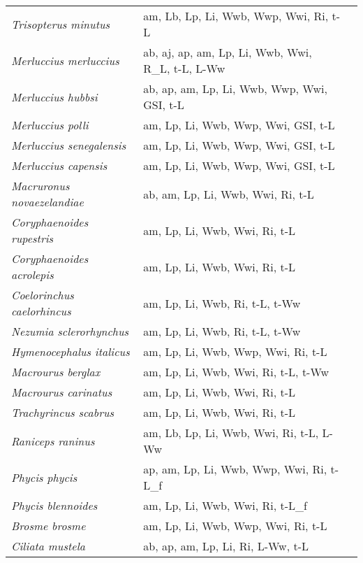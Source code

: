 {\begin{longtable}[c]{p{3.5cm}p{5.5cm}p{5.5cm}}
\emph{Trisopterus minutus} &  am, Lb, Lp, Li, Wwb, Wwp, Wwi, Ri, t-L & \citet{MunkNiel2005,Magn2007} \\
\emph{Merluccius merluccius} &  ab, aj, ap, am, Lp, Li, Wwb, Wwi, R\_L, t-L, L-Ww & \citet{PineSain2003} \\
\emph{Merluccius hubbsi} &  ab, ap, am, Lp, Li, Wwb, Wwp, Wwi, GSI, t-L & \citet{VazRoss2007,RodrLeon2018,BettBrow2014} \\
\emph{Merluccius polli} &  am, Lp, Li, Wwb, Wwp, Wwi, GSI, t-L & \citet{ReyFern2016} \\
\emph{Merluccius senegalensis} &  am, Lp, Li, Wwb, Wwp, Wwi, GSI, t-L & \citet{ReyFern2016} \\
\emph{Merluccius capensis} &  am, Lp, Li, Wwb, Wwp, Wwi, GSI, t-L & \citet{WilhMolo2017} \\
\emph{Macruronus novaezelandiae} &  ab, am, Lp, Li, Wwb, Wwi, Ri, t-L & \citet{SweeHadd2018} \\
\emph{Coryphaenoides rupestris} &  am, Lp, Li, Wwb, Wwi, Ri, t-L & \citet{AllaLora2000} \\
\emph{Coryphaenoides acrolepis} &  am, Lp, Li, Wwb, Wwi, Ri, t-L & \citet{Andr1997} \\
\emph{Coelorinchus caelorhincus} &  am, Lp, Li, Wwb, Ri, t-L, t-Ww & \citet{LabrPapa2000} \\
\emph{Nezumia sclerorhynchus} &  am, Lp, Li, Wwb, Ri, t-L, t-Ww & \citet{LabrPapa2000} \\
\emph{Hymenocephalus italicus} &  am, Lp, Li, Wwb, Wwp, Wwi, Ri, t-L & \citet{DOngBasa2000} \\
\emph{Macrourus berglax} &  am, Lp, Li, Wwb, Wwi, Ri, t-L, t-Ww & \citet{Muru2003,OrloVedi2018} \\
\emph{Macrourus carinatus} &  am, Lp, Li, Wwb, Wwi, Ri, t-L & \citet{LeeCock2019} \\
\emph{Trachyrincus scabrus} &  am, Lp, Li, Wwb, Wwi, Ri, t-L & \citet{SionMaio2012} \\
\emph{Raniceps raninus} &  am, Lb, Lp, Li, Wwb, Wwi, Ri, t-L, L-Ww & \citet{Deni1985,MunkNiel2005} \\
\emph{Phycis phycis} &  ap, am, Lp, Li, Wwb, Wwp, Wwi, Ri, t-L\_f & \citet{VieiNeve2014,MatiFerr2011} \\
\emph{Phycis blennoides} &  am, Lp, Li, Wwb, Wwi, Ri, t-L\_f & \citet{CasaPine2000} \\
\emph{Brosme brosme} &  am, Lp, Li, Wwb, Wwp, Wwi, Ri, t-L & \citet{Magn2007} \\
\emph{Ciliata mustela} &  ab, ap, am, Lp, Li, Ri, L-Ww, t-L & \citet{CoheInad1990,Smie1992,BadsSain1978} \\

\end{longtable}}
